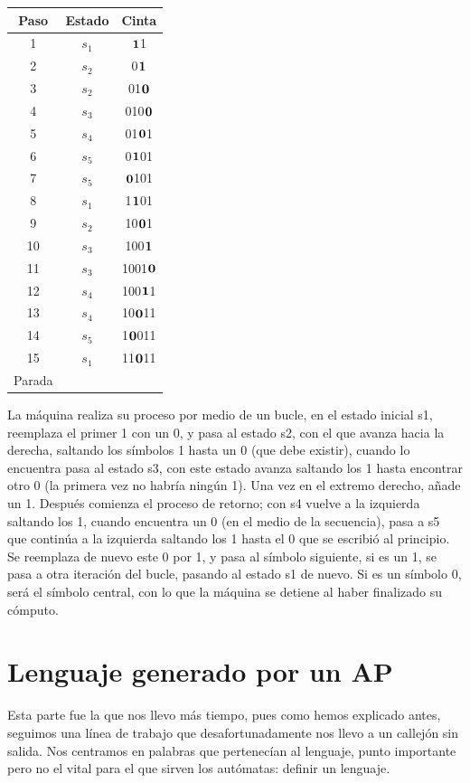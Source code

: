 \documentclass[12pt,a4paper,spanish]{book}
\begin{document}
\begin{itemize}
\begin{center}
\begin{tabular}{||c|c|c||}
\hline
Paso & Estado & Cinta\\
\hline
1 & $s_{1}$ & $\bf{1}$1\\
\hline
2 & $s_{2}$ & 0$\bf{1}$\\
\hline
3 & $s_{2}$ & 01$\bf{0}$\\
\hline
4 & $s_{3}$ & 010$\bf{0}$\\
\hline
5 & $s_{4}$ & 01$\bf{0}$1\\
\hline
6 & $s_{5}$ & 0$\bf{1}$01\\
\hline
7 & $s_{5}$ & $\bf{0}$101\\
\hline
8 & $s_{1}$ & 1$\bf{1}$01\\
\hline
9 & $s_{2}$ & 10$\bf{0}$1\\
\hline
10 & $s_{3}$ & 100$\bf{1}$\\
\hline
11 & $s_{3}$ & 1001$\bf{0}$\\
\hline
12 & $s_{4}$ & 100$\bf{1}$1\\
\hline
13 & $s_{4}$ & 10$\bf{0}$11\\
\hline
14 & $s_{5}$ & 1$\bf{0}$011\\
\hline
15 & $s_{1}$ & 11$\bf{0}$11\\
\hline
Parada & &\\
\hline
\end{tabular}
\end{center}
\newpage
La m\'aquina realiza su proceso por medio de un bucle, en el estado inicial s1, reemplaza el primer 1 con un 0, y pasa al estado s2, con el que avanza hacia la derecha, saltando los s\'imbolos 1 hasta un 0 (que debe existir), cuando lo encuentra pasa al estado s3, con este estado avanza saltando los 1 hasta encontrar otro 0 (la primera vez no habr\'ia ning\'un 1). Una vez en el extremo derecho, a\~nade un 1. Despu\'es comienza el proceso de retorno; con s4 vuelve a la izquierda saltando los 1, cuando encuentra un 0 (en el medio de la secuencia), pasa a s5 que contin\'ua a la izquierda saltando los 1 hasta el 0 que se escribi\'o al principio. Se reemplaza de nuevo este 0 por 1, y pasa al s\'imbolo siguiente, si es un 1, se pasa a otra iteraci\'on del bucle, pasando al estado s1 de nuevo. Si es un s\'imbolo 0, ser\'a el s\'imbolo central, con lo que la m\'aquina se detiene al haber finalizado su c\'omputo.
\end{itemize}
\newpage
\section{Lenguaje generado por un AP}
Esta parte fue la que nos llevo m\'as tiempo, pues como hemos explicado antes, seguimos una l\'inea de trabajo que desafortunadamente nos llevo a un callej\'on sin salida. Nos centramos en palabras que pertenec\'ian al lenguaje, punto importante pero no el vital para el que sirven los aut\'omatas: definir un lenguaje.
\end{document}
